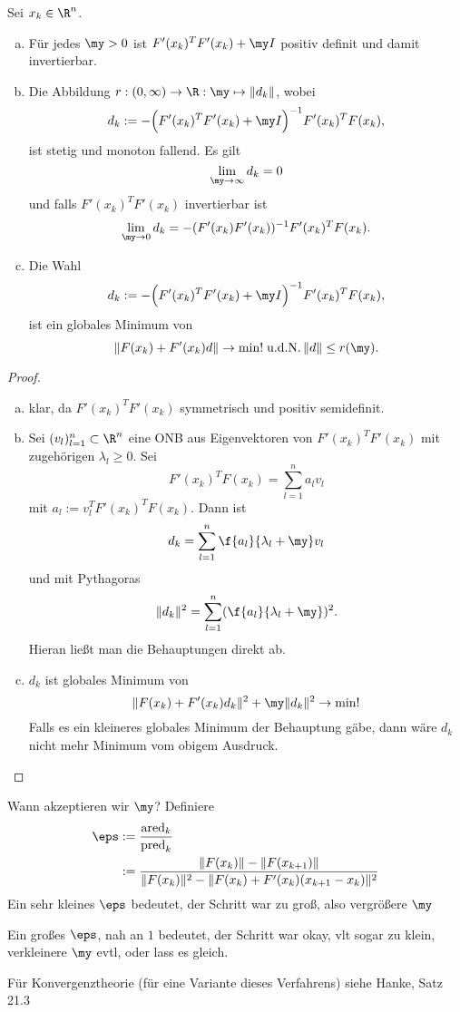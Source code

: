 \begin{lem} \label{2.61}
	Sei $x_k \in \R^n$.
	\begin{enumerate}[(a)]
		\item
			Für jedes $\my > 0$ ist $F'(x_k)^T F'(x_k) + \my I$ positiv definit und damit invertierbar.
		\item
			Die Abbildung $r: (0,\infty) \to \R: \my \mapsto \|d_k\|$, wobei
			\[
				d_k := -\Big( F'(x_k)^T F'(x_k) + \my I \Big)^{-1} F'(x_k)^T F(x_k),
			\]
			ist stetig und monoton fallend.
			Es gilt
			\[
				\lim_{\my\to\infty} d_k = 0
			\]
			und falls $F'(x_k)^T F'(x_k)$ invertierbar ist
			\[
				\lim_{\my\to 0} d_k = -(F'(x_k)F'(x_k))^{-1} F'(x_k)^T F(x_k).
			\]
		\item
			Die Wahl
			\[
				d_k := -\Big( F'(x_k)^T F'(x_k) + \my I \Big)^{-1} F'(x_k)^T F(x_k),
			\]
			ist ein globales Minimum von
			\[
				\| F(x_k) + F'(x_k) d \| \to \min!
				\udN
				\|d\| \le r(\my).
			\]
	\end{enumerate}
	\begin{proof}
		\begin{enumerate}[(a)]
			\item
				klar, da $F'(x_k)^T F'(x_k)$ symmetrisch und positiv semidefinit.
			\item
				Sei $(v_l)_{l=1}^n \subset \R^n$ eine ONB aus Eigenvektoren von $F'(x_k)^T F'(x_k)$ mit zugehörigen $\lambda_l \ge 0$.
				Sei
				\[
					F'(x_k)^T F(x_k)
					= \sum_{l=1}^n a_l v_l
				\]
				mit $a_l := v_l^T F'(x_k)^T F(x_k)$.
				Dann ist
				\[
					d_k = \sum_{l=1}^n \f {a_l}{\lambda_l + \my} v_l
				\]
				und mit Pythagoras
				\[
					\|d_k\|^2 = \sum_{l=1}^n ( \f {a_l}{\lambda_l + \my} )^2.
				\]
				Hieran ließt man die Behauptungen direkt ab.
			\item
				$d_k$ ist globales Minimum von
				\[
					\| F(x_k) + F'(x_k) d_k \|^2 + \my \|d_k\|^2 \to \min!
				\]
				Falls es ein kleineres globales Minimum der Behauptung gäbe, dann wäre $d_k$ nicht mehr Minimum vom obigem Ausdruck.
		\end{enumerate}
	\end{proof}
\end{lem}

Wann akzeptieren wir $\my$?
Definiere
\begin{align*}
	\eps
	&:= \dfrac {\mathrm{ared}_k}{\mathrm{pred}_k} \\
	&:= \dfrac {\|F(x_k)\| - \|F(x_{k+1})\|}{\|F(x_k)\|^2 - \|F(x_k) + F'(x_k) (x_{k+1} - x_k)\|^2}
\end{align*}
Ein sehr kleines $\eps$ bedeutet, der Schritt war zu groß, also vergrößere $\my$

Ein großes $\eps$, nah an $1$ bedeutet, der Schritt war okay, vlt sogar zu klein, verkleinere $\my$ evtl, oder lass es gleich.

\begin{alg} \label{alg:10}
\end{alg}

Für Konvergenztheorie (für eine Variante dieses Verfahrens) siehe Hanke, Satz 21.3 %
